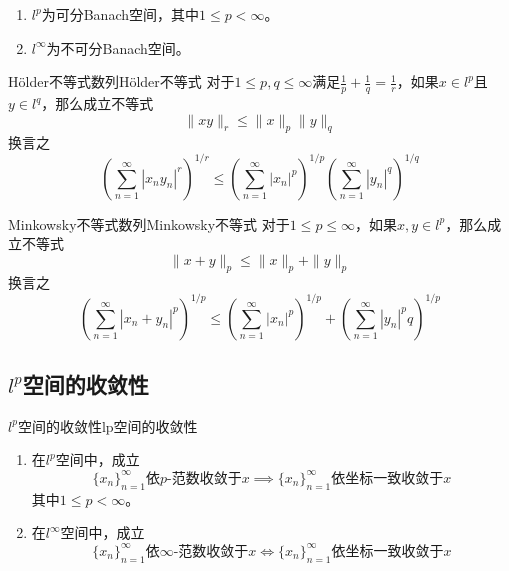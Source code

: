 \documentclass[lang = cn, scheme = chinese, thmcnt = section]{elegantbook}
\begin{document}
\begin{theorem}
	\begin{enumerate}
		\item $l^p$为可分Banach空间，其中$1\le p<\infty$。
		\item $l^\infty$为不可分Banach空间。
	\end{enumerate}
\end{theorem}

\begin{theorem}{Hölder不等式}{数列Hölder不等式}
	对于$1\le p,q \le\infty$满足$\frac{1}{p}+\frac{1}{q}=\frac{1}{r}$，如果$x\in l^p$且$y\in l^q$，那么成立不等式
	$$
	\| xy \|_r\le\|x\|_p \|y\|_q
	$$
	换言之
	$$
	\left(\sum_{n=1}^{\infty}|x_ny_n|^r\right)^{1/r}\le
	\left(\sum_{n=1}^{\infty}|x_n|^p\right)^{1/p}\left(\sum_{n=1}^{\infty}|y_n|^q\right)^{1/q}
	$$
\end{theorem}

\begin{theorem}{Minkowsky不等式}{数列Minkowsky不等式}
	对于$1\le p \le\infty$，如果$x,y\in l^p$，那么成立不等式
	$$
	\|x+y\|_p\le\|x\|_p+\|y\|_p
	$$
	换言之
	$$
	\left(\sum_{n=1}^{\infty}|x_n+y_n|^p\right)^{1/p}\le
	\left(\sum_{n=1}^{\infty}|x_n|^p\right)^{1/p}+\left(\sum_{n=1}^{\infty}|y_n|^pq\right)^{1/p}
	$$
\end{theorem}

\subsection{$l^p$空间的收敛性}

\begin{theorem}{$l^p$空间的收敛性}{lp空间的收敛性}
	\begin{enumerate}
		\item 在$l^p$空间中，成立
		$$
		\{x_n\}_{n=1}^{\infty}\text{依}p\text{-范数}\text{收敛于}x\implies
		\{x_n\}_{n=1}^{\infty}\text{依坐标一致收敛于}x
		$$
		其中$1\le p<\infty$。
		\item 在$l^\infty$空间中，成立
		$$
		\{x_n\}_{n=1}^{\infty}\text{依}\infty\text{-范数}\text{收敛于}x\iff \{x_n\}_{n=1}^{\infty}\text{依坐标一致收敛于}x
		$$
	\end{enumerate}
\end{theorem}
\end{document}
